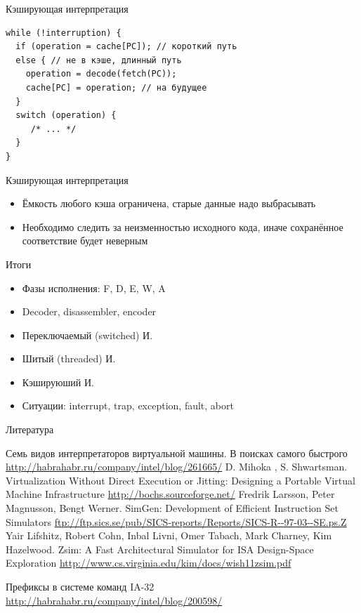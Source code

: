 \documentclass{beamer}
\begin{document}
\begin{frame}[fragile]{Кэширующая интерпретация}
\begin{verbatim}
while (!interruption) {
  if (operation = cache[PC]); // короткий путь
  else { // не в кэше, длинный путь
  	operation = decode(fetch(PC));
  	cache[PC] = operation; // на будущее
  }
  switch (operation) {
     /* ... */
  }
}
\end{verbatim}


\end{frame}

\begin{frame}{Кэширующая интерпретация}
\begin{itemize}
\item Ёмкость любого кэша ограничена, старые данные надо выбрасывать
\item Необходимо следить за неизменностью исходного кода, иначе сохранённое соответствие будет неверным
\end{itemize}
\end{frame}

\begin{frame}{Итоги}
\begin{itemize}
\item Фазы исполнения: F, D, E, W, A
\item Decoder, disassembler, encoder
\item Переключаемый (switched) И.
\item Шитый (threaded) И.
\item Кэшируюший И.
\item Ситуации: interrupt, trap, exception, fault, abort
\end{itemize}
\end{frame}

\begin{frame}[allowframebreaks]{Литература}
\begin{thebibliography}{99}
     Семь видов интерпретаторов виртуальной машины. В поисках самого быстрого \url{http://habrahabr.ru/company/intel/blog/261665/}
     D. Mihoka , S. Shwartsman. Virtualization Without Direct Execution or Jitting: Designing a Portable Virtual Machine Infrastructure \url{http://bochs.sourceforge.net/}
     Fredrik Larsson, Peter Magnusson, Bengt Werner. SimGen: Development of Efficient Instruction Set Simulators
\url{ftp://ftp.sics.se/pub/SICS-reports/Reports/SICS-R--97-03--SE.ps.Z}
     Yair Lifshitz, Robert Cohn, Inbal Livni, Omer Tabach, Mark Charney, Kim Hazelwood. Zsim: A Fast Architectural Simulator for ISA Design-Space Exploration \url{http://www.cs.virginia.edu/kim/docs/wish11zsim.pdf}
    
     Префиксы в системе команд IA-32 \url{http://habrahabr.ru/company/intel/blog/200598/}

\end{thebibliography}
\end{frame}
\end{document}
